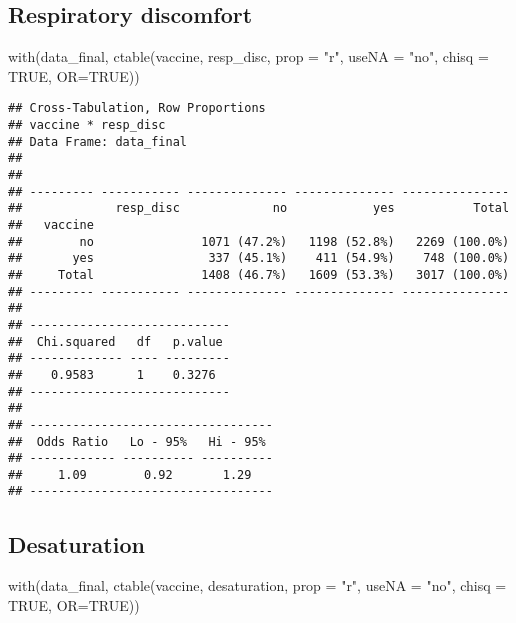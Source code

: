 \documentclass[
]{article}
\newenvironment{Shaded}{\begin{snugshade}}{\end{snugshade}}
\newcommand{\AttributeTok}[1]{\textcolor[rgb]{0.77,0.63,0.00}{#1}}
\newcommand{\ConstantTok}[1]{\textcolor[rgb]{0.00,0.00,0.00}{#1}}
\newcommand{\FunctionTok}[1]{\textcolor[rgb]{0.00,0.00,0.00}{#1}}
\newcommand{\NormalTok}[1]{#1}
\newcommand{\StringTok}[1]{\textcolor[rgb]{0.31,0.60,0.02}{#1}}
\begin{document}
\hypertarget{respiratory-discomfort}{%
\subsection{Respiratory discomfort}\label{respiratory-discomfort}}

\begin{Shaded}
\begin{Highlighting}[]
\FunctionTok{with}\NormalTok{(data\_final, }\FunctionTok{ctable}\NormalTok{(vaccine, resp\_disc, }\AttributeTok{prop =} \StringTok{"r"}\NormalTok{, }\AttributeTok{useNA =} \StringTok{"no"}\NormalTok{, }\AttributeTok{chisq =} \ConstantTok{TRUE}\NormalTok{, }\AttributeTok{OR=}\ConstantTok{TRUE}\NormalTok{))}
\end{Highlighting}
\end{Shaded}

\begin{verbatim}
## Cross-Tabulation, Row Proportions  
## vaccine * resp_disc  
## Data Frame: data_final  
## 
## 
## --------- ----------- -------------- -------------- ---------------
##             resp_disc             no            yes           Total
##   vaccine                                                          
##        no               1071 (47.2%)   1198 (52.8%)   2269 (100.0%)
##       yes                337 (45.1%)    411 (54.9%)    748 (100.0%)
##     Total               1408 (46.7%)   1609 (53.3%)   3017 (100.0%)
## --------- ----------- -------------- -------------- ---------------
## 
## ----------------------------
##  Chi.squared   df   p.value 
## ------------- ---- ---------
##    0.9583      1    0.3276  
## ----------------------------
## 
## ----------------------------------
##  Odds Ratio   Lo - 95%   Hi - 95% 
## ------------ ---------- ----------
##     1.09        0.92       1.29   
## ----------------------------------
\end{verbatim}

\hypertarget{desaturation}{%
\subsection{Desaturation}\label{desaturation}}

\begin{Shaded}
\begin{Highlighting}[]
\FunctionTok{with}\NormalTok{(data\_final, }\FunctionTok{ctable}\NormalTok{(vaccine, desaturation, }\AttributeTok{prop =} \StringTok{"r"}\NormalTok{, }\AttributeTok{useNA =} \StringTok{"no"}\NormalTok{, }\AttributeTok{chisq =} \ConstantTok{TRUE}\NormalTok{, }\AttributeTok{OR=}\ConstantTok{TRUE}\NormalTok{))}
\end{Highlighting}
\end{Shaded}
\end{document}

